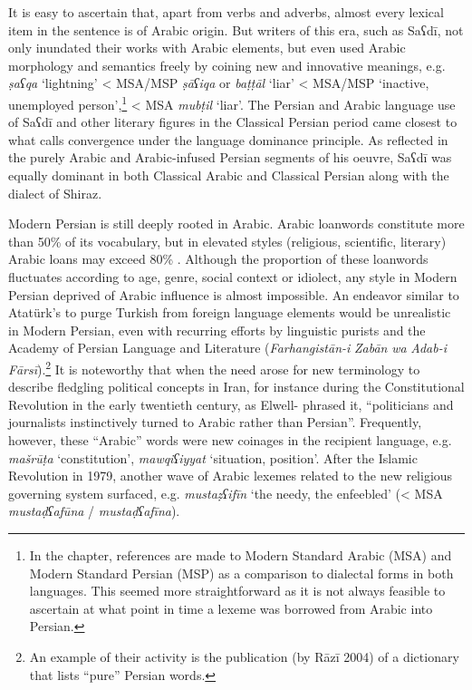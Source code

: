\documentclass[output=paper]{langsci/langscibook}
\begin{document}
It is easy to ascertain that, apart from verbs and adverbs, almost every lexical item in the sentence is of Arabic origin. But writers of this era, such as Saʕdī, not only inundated their works with Arabic elements, but even used Arabic morphology and semantics freely by coining new and innovative meanings, e.g. \textit{ṣaʕqa} ‘lightning’ < MSA/MSP \textit{ṣāʕiqa} or \textit{baṭṭāl} ‘liar’ < MSA/MSP ‘inactive, unemployed person’,\footnote{In the chapter, references are made to Modern Standard Arabic (MSA) and Modern Standard Persian (MSP) as a comparison to dialectal forms in both languages. This seemed more straightforward as it is not always feasible to ascertain at what point in time a lexeme was borrowed from Arabic into Persian.} < MSA \textit{mubṭil} ‘liar’. The Persian and Arabic language use of Saʕdī and other literary figures in the Classical Persian period came closest to what \citet{Lucas2015} calls convergence under the language dominance principle. As reflected in the purely Arabic and Arabic-infused Persian segments of his oeuvre, Saʕdī was equally dominant in both Classical Arabic and Classical Persian along with the dialect of Shiraz.

Modern Persian is still deeply rooted in Arabic. Arabic loanwords constitute more than 50\% of its vocabulary, but in elevated styles (religious, scientific, literary) Arabic loans may exceed 80\% \citep{Jeremiás2011}. Although the proportion of these loanwords fluctuates according to age, genre, social context or idiolect, any style in Modern Persian deprived of Arabic influence is almost impossible. An endeavor similar to Atatürk’s to purge Turkish from foreign language elements would be unrealistic in Modern Persian, even with recurring efforts by linguistic purists and the Academy of Persian Language and Literature (\textit{Farhangistān-i} \textit{Zabān} \textit{wa} \textit{Adab-i} \textit{Fārsī}).\footnote{An example of their activity is the publication (by Rāzī 2004) of a dictionary that lists “pure” Persian words.} It is noteworthy that when the need arose for new terminology to describe fledgling political concepts in Iran, for instance during the Constitutional Revolution in the early twentieth\textsuperscript{} century, as Elwell-\citet{Sutton2000} phrased it, “politicians and journalists instinctively turned to Arabic rather than Persian”. Frequently, however, these “Arabic” words were new coinages in the recipient language, e.g. \textit{mašrūṭa} ‘constitution’, \textit{mawqiʕiyyat} ‘situation, position’. After the Islamic Revolution in 1979, another wave of Arabic lexemes related to the new religious governing system surfaced, e.g. \textit{mustaẓʕifīn} ‘the needy, the enfeebled’ (< MSA \textit{mustaḍʕafūna} / \textit{mustaḍʕafīna}).
\end{document}
